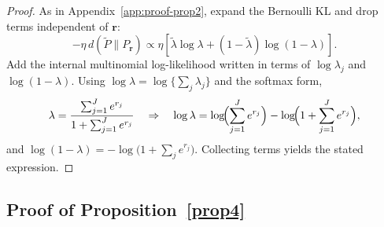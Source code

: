 \documentclass{article}
\theoremstyle{plain}
\newtheorem{proposition}[theorem]{Proposition}
\theoremstyle{definition}
\theoremstyle{remark}
\begin{document}

\begin{proof}
As in Appendix~\ref{app:proof-prop2}, expand the Bernoulli KL and drop terms
independent of $\bm r$:
\[
-\eta\,d(\tilde P\parallel P_{\bm r})
\propto
\eta\left[\tilde\lambda\log\lambda+(1-\tilde\lambda)\log(1-\lambda)\right].
\]
Add the internal multinomial log-likelihood written in terms of $\log\lambda_j$ and $\log(1-\lambda)$.
Using $\log\lambda=\log\{\sum_j\lambda_j\}$ and the softmax form,
\[
\lambda=\frac{\sum_{j=1}^Je^{r_j}}{1+\sum_{j=1}^Je^{r_j}}
\quad\Rightarrow\quad
\log\lambda=\log\!\Bigl(\sum_{j=1}^Je^{r_j}\Bigr)-\log\!\Bigl(1+\sum_{j=1}^Je^{r_j}\Bigr),
\]
and $\log(1-\lambda)=-\log\bigl(1+\sum_j e^{r_j}\bigr)$.
Collecting terms yields the stated expression.
\end{proof}

\subsection{Proof of Proposition~\ref{prop4}}
\label{app:specific2specific}
\end{document}
